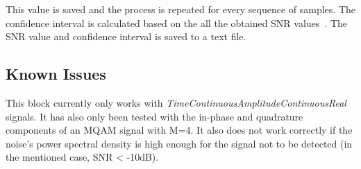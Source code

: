 \begin{refsection}
This value is saved and the process is repeated for every sequence of samples. The confidence interval is calculated based on the all the obtained SNR values~\cite{tranter2004principles}. The SNR value and confidence interval is saved to a text file.




\subsection*{Known Issues}\label{snrestissues}

This block currently only works with \textit{TimeContinuousAmplitudeContinuousReal} signals. It has also only been tested with the in-phase and quadrature components of an MQAM signal with M=4.
It also does not work correctly if the noise's power spectral density is high enough for the signal not to be detected (in the mentioned case, SNR < -10dB).





\clearpage
\printbibliography[heading=subbibliography]
\end{refsection}
\cleardoublepage
